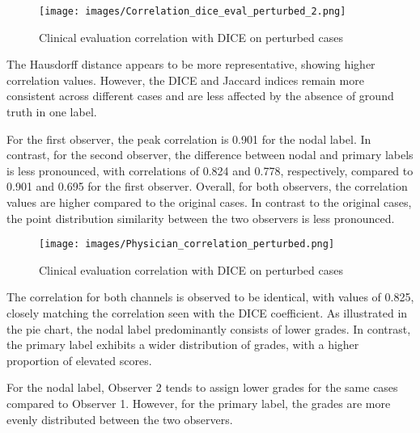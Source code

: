 \begin{figure}[ht]
    \centering
    \texttt{[image: images/Correlation\_dice\_eval\_perturbed\_2.png]}
    \caption{Clinical evaluation correlation with DICE on perturbed cases}
    \label{fig:three_subfigures}
\end{figure}


The Hausdorff distance appears to be more representative, showing higher correlation values. However, the DICE and Jaccard indices remain more consistent across different cases and are less affected by the absence of ground truth in one label.

For the first observer, the peak correlation is 0.901 for the nodal label. In contrast, for the second observer, the difference between nodal and primary labels is less pronounced, with correlations of 0.824 and 0.778, respectively, compared to 0.901 and 0.695 for the first observer. Overall, for both observers, the correlation values are higher compared to the original cases.
In contrast to the original cases, the point distribution similarity between the two observers is less pronounced.

\newpage
\begin{figure}[ht]
    \centering
    \texttt{[image: images/Physician\_correlation\_perturbed.png]}
    \caption{Clinical evaluation correlation with DICE on perturbed cases}
    \label{fig:three_subfigures}
\end{figure}

The correlation for both channels is observed to be identical, with values of 0.825, closely matching the correlation seen with the DICE coefficient. As illustrated in the pie chart, the nodal label predominantly consists of lower grades. In contrast, the primary label exhibits a wider distribution of grades, with a higher proportion of elevated scores.

For the nodal label, Observer 2 tends to assign lower grades for the same cases compared to Observer 1. However, for the primary label, the grades are more evenly distributed between the two observers.

